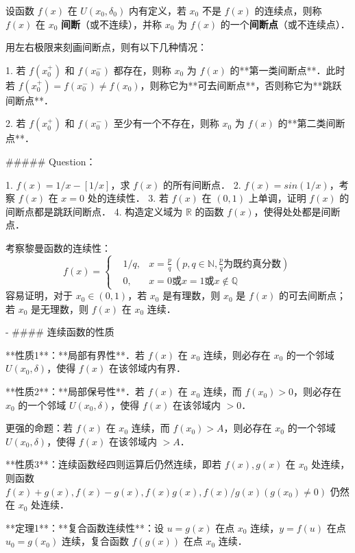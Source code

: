   设函数 $f(x)$ 在 $U(x_0,\delta_0)$ 内有定义，若 $x_0$ 不是 $f(x)$ 的连续点，则称 $f(x)$ 在 $x_0$ \textbf{间断}（或不连续），并称 $x_0$ 为 $f(x)$ 的一个\textbf{间断点}（或不连续点）．

  用左右极限来刻画间断点，则有以下几种情况：

  1. 若 $f(x_0^+)$ 和 $f(x_0^-)$ 都存在，则称 $x_0$ 为 $f(x)$ 的**第一类间断点**．此时若 $f(x_0^+)=f(x_0^-)\neq f(x_0)$，则称它为**可去间断点**，否则称它为**跳跃间断点**．

  2. 若 $f(x_0^+)$ 和 $f(x_0^-)$ 至少有一个不存在，则称 $x_0$ 为 $f(x)$ 的**第二类间断点**．

  ##### Question：

  1. $f(x)=1/x-[1/x]$，求 $f(x)$ 的所有间断点．
  2. $f(x)=sin(1/x)$，考察 $f(x)$ 在 $x=0$ 处的连续性．
  3. 若 $f(x)$ 在 $(0,1)$ 上单调，证明 $f(x)$ 的间断点都是跳跃间断点．
  4. 构造定义域为 $\mathbb{R}$ 的函数 $f(x)$，使得处处都是间断点． 

  考察黎曼函数的连续性：
\begin{equation}
f(x)=\left\{
\begin{aligned}
&1/q, &x=\frac{p}{q}\ (p,q\in \mathbb{N}, \frac{p}{q}\text{为既约真分数})\\
&0,&x=0\text{或}x=1\text{或} x\notin \mathbb{Q}
\end{aligned} \right.
\end{equation}
  容易证明，对于 $x_0\in(0,1)$，若 $x_0$ 是有理数，则 $x_0$ 是 $f(x)$ 的可去间断点；若 $x_0$ 是无理数，则 $f(x)$ 在 $x_0$ 连续．

  

- #### 连续函数的性质

  **性质1**：**局部有界性**．若 $f(x)$ 在 $x_0$ 连续，则必存在 $x_0$ 的一个邻域 $U(x_0,\delta)$，使得 $f(x)$ 在该邻域内有界．

  **性质2**：**局部保号性**．若 $f(x)$ 在 $x_0$ 连续，而 $f(x_0)>0$，则必存在 $x_0$ 的一个邻域 $U(x_0,\delta)$，使得 $f(x)$ 在该邻域内 $>0$．

  更强的命题：若 $f(x)$ 在 $x_0$ 连续，而 $f(x_0)>A$，则必存在 $x_0$ 的一个邻域 $U(x_0,\delta)$，使得 $f(x)$ 在该邻域内 $>A$．

  **性质3**：连续函数经四则运算后仍然连续，即若 $f(x),g(x)$ 在 $x_0$ 处连续，则函数 $f(x)+g(x),f(x)-g(x),f(x)g(x),f(x)/g(x)(g(x_0)\neq 0)$ 仍然在 $x_0$ 处连续．

  **定理1**：**复合函数连续性**：设 $u=g(x)$ 在点 $x_0$ 连续，$y=f(u)$ 在点 $u_0=g(x_0)$ 连续，复合函数 $f(g(x))$ 在点 $x_0$ 连续．

